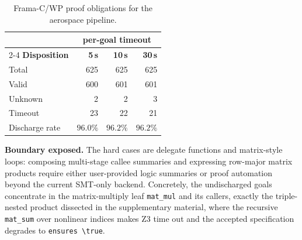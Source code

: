\begin{table}[!t]
  \centering
  \caption{Frama-C/WP proof obligations for the aerospace pipeline.}
  \label{tab:case9-wp}
  \begin{tabular}{lrrr}
    \toprule
    & \multicolumn{3}{c}{\textbf{per-goal timeout}} \\
    \cmidrule(lr){2-4}
    \textbf{Disposition} & \textbf{5\,s} & \textbf{10\,s} & \textbf{30\,s} \\
    \midrule
    Total       & 625           & 625           & 625           \\
    Valid       & 600           & 601           & 601           \\
    Unknown     & 2             & 2             & 3             \\
    Timeout     & 23            & 22            & 21            \\
    \midrule
    Discharge rate & $96.0\%$ & $96.2\%$ & $96.2\%$ \\
    \bottomrule
  \end{tabular}
\end{table}

\smallskip
\noindent\textbf{Boundary exposed.}
 The hard cases are delegate functions and matrix-style loops: composing multi-stage callee summaries and expressing row-major matrix products require either user-provided logic summaries or proof automation beyond the current SMT-only backend.  Concretely, the undischarged goals concentrate in the matrix-multiply leaf \texttt{mat\_mul} and its callers, exactly the triple-nested product dissected in the supplementary material, where the recursive \texttt{mat\_sum} over nonlinear indices makes Z3 time out and the accepted specification degrades to \texttt{ensures \textbackslash true}.
